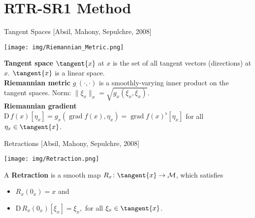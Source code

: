 \documentclass{beamer}
\begin{document}
\section{RTR-SR1 Method}

\begin{frame}{Tangent Spaces}
    \vspace{-0.5\baselineskip}\hfill{\tiny{[Absil, Mahony, Sepulchre, 2008]}}
    \begin{center}
        \texttt{[image: img/Riemannian\_Metric.png]}
    \end{center}
    \textbf{Tangent space} $\tangent{x}$ at $x$ is the set of all tangent vectors (directions) at $x$. $\tangent{x}$ is a linear space. \\[0.2\baselineskip]
    \textbf{Riemannian metric} $g_{\cdot} (\cdot, \cdot)$ is a smoothly-varying inner product on the tangent spaces. Norm: $\lVert \xi_x \rVert_x = \sqrt{g_x(\xi_x, \xi_x)}$. \\[0.2\baselineskip]
    \textbf{Riemannian gradient} \\
    $\mathrm{D} \, f(x) [\eta_x] = g_x (\operatorname{grad} f(x), \eta_x) = {\operatorname{grad} f(x)}^{\flat} [\eta_x]$ for all $\eta_x \in \tangent{x}$.
\end{frame}

\begin{frame}{Retractions}
    \vspace{-0.5\baselineskip}\hfill{\tiny{[Absil, Mahony, Sepulchre, 2008]}}
    \begin{center}
        \texttt{[image: img/Retraction.png]}
    \end{center}
    A \textbf{Retraction} is a smooth map $R_x \colon \tangent{x} \to \mathcal{M}$, which satisfies \\[-0.1\baselineskip]
    \begin{itemize}
        \item $R_x (0_x) = x$ and
        \item $\mathrm{D} \, R_x (0_x)[\xi_x] = \xi_x,$ for all $\xi_x \in \tangent{x}$.
    \end{itemize}
\end{frame}
\end{document}
